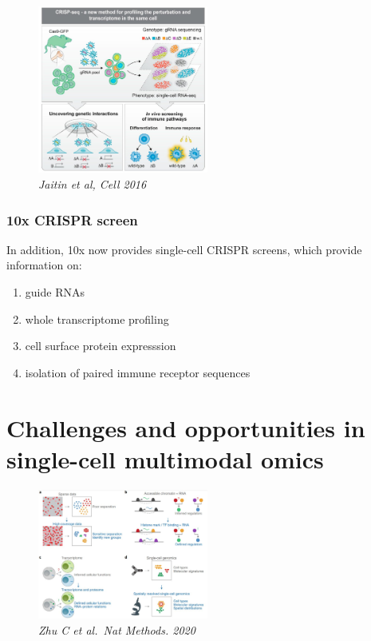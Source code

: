 \begin{figure}
\centering
\includegraphics[width=0.5\textwidth]{images/Screenshot_13.png}
\caption{\emph{Jaitin et al, Cell 2016}}
\end{figure}

\hypertarget{x-crispr-screen}{%
\subsubsection{10x CRISPR screen}\label{x-crispr-screen}}

In addition, 10x now provides single-cell CRISPR screens, which provide
information on:

\begin{enumerate}
\def\labelenumi{\arabic{enumi}.}
\tightlist
\item
  guide RNAs
\item
  whole transcriptome profiling
\item
  cell surface protein expresssion
\item
  isolation of paired immune receptor sequences
\end{enumerate}

\hypertarget{challenges-and-opportunities-in-single-cell-multimodal-omics}{%
\section{Challenges and opportunities in single-cell multimodal
omics}\label{challenges-and-opportunities-in-single-cell-multimodal-omics}}

\begin{figure}
\centering
\includegraphics[width=0.5\textwidth]{images/Screenshot_14.png}
\caption{\emph{Zhu C et al.~Nat Methods. 2020}}
\end{figure}


